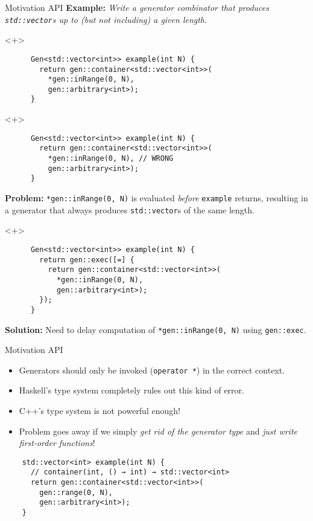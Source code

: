 \begin{frame}[fragile,t]{\halcheck{} \textemdash{} Motivation \textemdash{} API}
  \textbf{Example:} \emph{Write a generator combinator that produces \texttt{std::vector}s up to (but not including) a given length.}

  \begin{onlyenv}<+>
    \begin{verbatim}
      Gen<std::vector<int>> example(int N) {
        return gen::container<std::vector<int>>(
          *gen::inRange(0, N),
          gen::arbitrary<int>);
      }
    \end{verbatim}
  \end{onlyenv}

  \begin{onlyenv}<+>
    \begin{verbatim}
      Gen<std::vector<int>> example(int N) {
        return gen::container<std::vector<int>>(
          *gen::inRange(0, N), // WRONG
          gen::arbitrary<int>);
      }
    \end{verbatim}

    \textbf{Problem:} \texttt{*gen::inRange(0, N)} is evaluated \emph{before} \texttt{example} returns, resulting in a generator that always produces \texttt{std::vector}s of the same length.
  \end{onlyenv}

  \begin{onlyenv}<+>
    \begin{verbatim}
      Gen<std::vector<int>> example(int N) {
        return gen::exec([=] {
          return gen::container<std::vector<int>>(
            *gen::inRange(0, N),
            gen::arbitrary<int>);
        });
      }
    \end{verbatim}

    \textbf{Solution:} Need to delay computation of \texttt{*gen::inRange(0, N)} using \texttt{gen::exec}.
  \end{onlyenv}
\end{frame}

\begin{frame}[fragile]{\halcheck{} \textemdash{} Motivation \textemdash{} API}
  \begin{itemize}
    \item Generators should only be invoked (\texttt{operator *}) in the correct context.
    \item Haskell's type system completely rules out this kind of error.
    \item C++'s type system is not powerful enough!
    \item Problem goes away if we simply \emph{get rid of the generator type} and \emph{just write first-order functions}!
  \end{itemize}

  \begin{verbatim}
    std::vector<int> example(int N) {
      // container(int, () → int) → std::vector<int>
      return gen::container<std::vector<int>>(
        gen::range(0, N),
        gen::arbitrary<int>);
    }
  \end{verbatim}
\end{frame}

